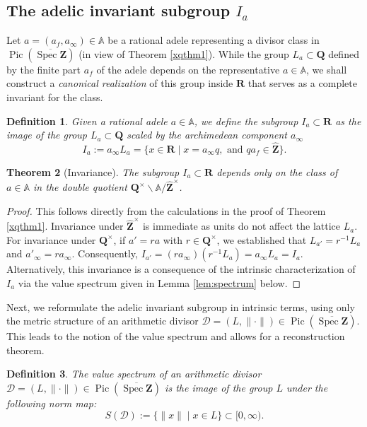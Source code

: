 \documentclass[11pt,a4paper]{article}
\newcommand{\Q}{\mathbf{Q}}
\newcommand{\Z}{\mathbf{Z}}
\newcommand{\R}{\mathbf{R}}
\newcommand{\A}{\mathbb{A}}
\newcommand{\Zhat}{\widehat{\Z}}
\def\spzb{\overline{\Spec \Z}}
\newcommand{\Spec}{\operatorname{Spec}}
\def\Pic{\operatorname{Pic}}
\theoremstyle{plain}
\newtheorem{thm}{Theorem}[section]
\newtheorem{defn}[thm]{Definition}
\theoremstyle{definition} %
\begin{document}
\subsection{The adelic invariant subgroup $I_a$}

Let $a=(a_f,a_\infty) \in \A$ be a rational adele representing a divisor class in $\Pic(\spzb)$ (in view of Theorem \ref{xqthm1}). While the group $L_a \subset \Q$ defined by the finite part $a_f$ of the adele depends on the representative $a\in\A$, we shall construct a \emph{canonical realization} of this group inside $\R$ that serves as a complete invariant for the class.

\begin{defn}\label{adinv}
Given a rational adele $a\in\A$, we define the subgroup $I_a \subset \R$ as the image of the group $L_a\subset \Q$ scaled by the archimedean component $a_\infty$
\[
I_a := a_\infty L_a = \{ x \in \R \mid x = a_\infty q, \text{ and } q a_f \in \Zhat \}.
\]
\end{defn}

\begin{thm}[Invariance]
The subgroup $I_a\subset \R$ depends only on the class of $a\in\A$ in the double quotient $\Q^\times \backslash \A / \Zhat^\times$.
\end{thm}

\begin{proof}
This follows directly from the calculations in the proof of Theorem \ref{xqthm1}. Invariance under $\Zhat^\times$ is immediate as units do not affect the lattice $L_a$. For invariance under $\Q^\times$, if $a' = r a$ with $r \in \Q^\times$, we established that $L_{a'} = r^{-1} L_a$ and $a'_\infty = r a_\infty$. Consequently, $I_{a'} = (r a_\infty)(r^{-1} L_a) = a_\infty L_a = I_a$.
Alternatively, this invariance is a consequence of the intrinsic characterization of $I_a$ via the value spectrum given in Lemma \ref{lem:spectrum} below.
\end{proof}

Next, we reformulate the adelic invariant subgroup in intrinsic terms, using only the metric
structure of an arithmetic divisor $\mathcal{D} = (L, \|\cdot\|)\in \Pic(\spzb)$.
This leads to the notion of the value spectrum and allows for a reconstruction
theorem. %

\begin{defn}
The value spectrum of an arithmetic divisor $\mathcal{D} = (L, \|\cdot\|)\in \Pic(\spzb)$ is the image of the group $L$ under the following norm map:
\[
S(\mathcal{D}) := \{ \|x\| \mid x \in L \} \subset [0, \infty).
\]
\end{defn}
\end{document}
